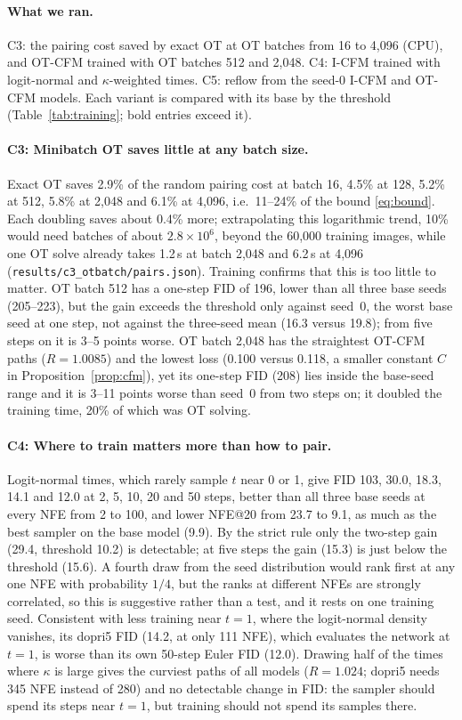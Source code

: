 \paragraph{What we ran.} C3: the pairing cost saved by exact OT at OT batches from 16 to 4,096 (CPU), and OT-CFM trained with OT batches 512 and 2,048. C4: I-CFM trained with logit-normal and $\kappa$-weighted times. C5: reflow from the seed-0 I-CFM and OT-CFM models. Each variant is compared with its base by the threshold (Table~\ref{tab:training}; bold entries exceed it).

\paragraph{C3: Minibatch OT saves little at any batch size.} Exact OT saves 2.9\% of the random pairing cost at batch 16, 4.5\% at 128, 5.2\% at 512, 5.8\% at 2,048 and 6.1\% at 4,096, i.e.\ 11--24\% of the bound \eqref{eq:bound}. Each doubling saves about 0.4\% more; extrapolating this logarithmic trend, 10\% would need batches of about $2.8\times10^6$, beyond the 60,000 training images, while one OT solve already takes 1.2\,s at batch 2,048 and 6.2\,s at 4,096 (\texttt{results/c3\_otbatch/pairs.json}). Training confirms that this is too little to matter. OT batch 512 has a one-step FID of 196, lower than all three base seeds (205--223), but the gain exceeds the threshold only against seed~0, the worst base seed at one step, not against the three-seed mean (16.3 versus 19.8); from five steps on it is 3--5 points worse. OT batch 2,048 has the straightest OT-CFM paths ($R=1.0085$) and the lowest loss (0.100 versus 0.118, a smaller constant $C$ in Proposition~\ref{prop:cfm}), yet its one-step FID (208) lies inside the base-seed range and it is 3--11 points worse than seed~0 from two steps on; it doubled the training time, 20\% of which was OT solving. %
\paragraph{C4: Where to train matters more than how to pair.} Logit-normal times, which rarely sample $t$ near 0 or 1, give FID 103, 30.0, 18.3, 14.1 and 12.0 at 2, 5, 10, 20 and 50 steps, better than all three base seeds at every NFE from 2 to 100, and lower NFE@20 from 23.7 to 9.1, as much as the best sampler on the base model (9.9). By the strict rule only the two-step gain (29.4, threshold 10.2) is detectable; at five steps the gain (15.3) is just below the threshold (15.6). A fourth draw from the seed distribution would rank first at any one NFE with probability $1/4$, but the ranks at different NFEs are strongly correlated, so this is suggestive rather than a test, and it rests on one training seed. Consistent with less training near $t=1$, where the logit-normal density vanishes, its dopri5 FID (14.2, at only 111 NFE), which evaluates the network at $t=1$, is worse than its own 50-step Euler FID (12.0). Drawing half of the times where $\kappa$ is large gives the curviest paths of all models ($R=1.024$; dopri5 needs 345 NFE instead of 280) and no detectable change in FID: the sampler should spend its steps near $t=1$, but training should not spend its samples there. %
